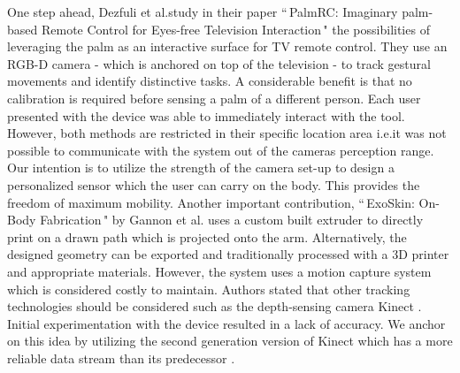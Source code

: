 One step ahead, Dezfuli et al.\cite{Dezfuli:2012:PIP:2325616.2325623}\;study in their paper ``\,PalmRC: Imaginary palm-based Remote Control for Eyes-free Television Interaction\," the possibilities of leveraging the palm as an interactive surface for TV remote control. They use an RGB-D camera - which is anchored on top of the television - to track gestural movements and identify distinctive tasks. A considerable benefit is that no calibration is required before sensing a palm of a different person. Each user presented with the device was able to immediately interact with the tool. However, both methods are restricted in their specific location area i.e.\;it was not possible to communicate with the system out of the cameras perception range. Our intention is to utilize the strength of the camera set-up to design a personalized sensor which the user can carry on the body. This provides the freedom of maximum mobility.
\newpara
Another important contribution, ``\,ExoSkin: On-Body Fabrication\," by Gannon et al.\;\cite{Gannon:2016:EOF:2858036.2858576} uses a custom built extruder to directly print on a drawn path which is projected onto the arm. Alternatively, the designed geometry can be exported and traditionally processed with a 3D printer and appropriate materials. However, the system uses a motion capture system which is considered costly to maintain. Authors stated that other tracking technologies should be considered such as the depth-sensing camera Kinect \cite{Zhang:2012:MKS:2225053.2225203}. Initial experimentation with the device resulted in a lack of accuracy. We anchor on this idea by utilizing the second generation version of Kinect which has a more reliable data stream than its predecessor \cite{wasenmuller2016comparison}.\\




